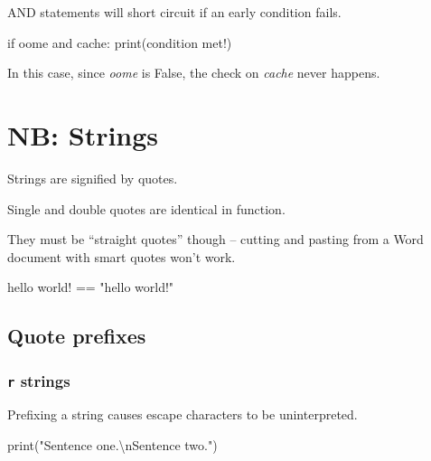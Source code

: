\documentclass[
  letterpaper,
  DIV=11,
  numbers=noendperiod]{scrreprt}
\newenvironment{Shaded}{\begin{snugshade}}{\end{snugshade}}
\newcommand{\BuiltInTok}[1]{\textcolor[rgb]{0.00,0.23,0.31}{#1}}
\newcommand{\CharTok}[1]{\textcolor[rgb]{0.13,0.47,0.30}{#1}}
\newcommand{\CommentTok}[1]{\textcolor[rgb]{0.37,0.37,0.37}{#1}}
\newcommand{\ControlFlowTok}[1]{\textcolor[rgb]{0.00,0.23,0.31}{#1}}
\newcommand{\KeywordTok}[1]{\textcolor[rgb]{0.00,0.23,0.31}{#1}}
\newcommand{\NormalTok}[1]{\textcolor[rgb]{0.00,0.23,0.31}{#1}}
\newcommand{\OperatorTok}[1]{\textcolor[rgb]{0.37,0.37,0.37}{#1}}
\newcommand{\StringTok}[1]{\textcolor[rgb]{0.13,0.47,0.30}{#1}}
\begin{document}
AND statements will short circuit if an early condition fails.

\begin{Shaded}
\begin{Highlighting}[]
\ControlFlowTok{if}\NormalTok{ oome }\KeywordTok{and}\NormalTok{ cache:}
    \BuiltInTok{print}\NormalTok{(}\StringTok{\textquotesingle{}condition met!\textquotesingle{}}\NormalTok{)}
\end{Highlighting}
\end{Shaded}

In this case, since \emph{oome} is False, the check on \emph{cache}
never happens.

\hypertarget{nb-strings}{%
\chapter{NB: Strings}\label{nb-strings}}

Strings are signified by quotes.

Single and double quotes are identical in function.

They must be ``straight quotes'' though -- cutting and pasting from a
Word document with smart quotes won't work.

\begin{Shaded}
\begin{Highlighting}[]
\CommentTok{\textquotesingle{}hello world!\textquotesingle{}} \OperatorTok{==} \StringTok{"hello world!"}
\end{Highlighting}
\end{Shaded}

\hypertarget{quote-prefixes}{%
\section{Quote prefixes}\label{quote-prefixes}}

\hypertarget{r-strings}{%
\subsection{\texorpdfstring{\texttt{r}
strings}{r strings}}\label{r-strings}}

Prefixing a string causes escape characters to be uninterpreted.

\begin{Shaded}
\begin{Highlighting}[]
\BuiltInTok{print}\NormalTok{(}\StringTok{"Sentence one.}\CharTok{\textbackslash{}n}\StringTok{Sentence two."}\NormalTok{)}
\end{Highlighting}
\end{Shaded}
\end{document}
